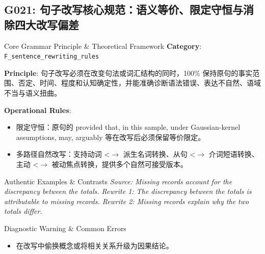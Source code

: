 \subsection{G021: 句子改写核心规范：语义等价、限定守恒与消除四大改写偏差}\label{sec:rule:G021}
\begin{ConceptBox}{Core Grammar Principle \& Theoretical Framework}
\textbf{Category}: \texttt{F\_sentence\_rewriting\_rules}\par\vspace{3pt}
\textbf{Principle}: 句子改写必须在改变句法或词汇结构的同时，100\% 保持原句的事实范围、否定、时间、程度和认知确定性，并能准确诊断语法错误、表达不自然、语域不当与语义扭曲。\par\vspace{4pt}
\textbf{Operational Rules}:
\begin{itemize}[leftmargin=1.5em, itemsep=1pt]
  \item 限定守恒：原句的 provided that, in this sample, under Gaussian-kernel assumptions, may, arguably 等在改写后必须保留等价限定。
  \item 多路径自然改写：支持动词 <$\to$ 派生名词转换、从句 <$\to$ 介词短语转换、主动 <$\to$ 被动焦点转换，提供多个自然可接受版本。
\end{itemize}
\end{ConceptBox}
\begin{ExampleBox}{Authentic Examples \& Contrasts}
\textit{Source: Missing records account for the discrepancy between the totals.
Rewrite 1: The discrepancy between the totals is attributable to missing records.
Rewrite 2: Missing records explain why the two totals differ.}\par\vspace{2pt}
\end{ExampleBox}
\begin{TipBox}{Diagnostic Warning \& Common Errors}
\begin{itemize}[leftmargin=1.5em, itemsep=1pt]
  \item 在改写中偷换概念或将相关关系升级为因果结论。
\end{itemize}
\end{TipBox}
\vspace{6pt}
